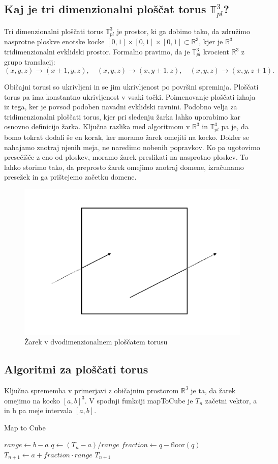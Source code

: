 \documentclass[titlepage]{article}
\begin{document}
\subsection{Kaj je tri dimenzionalni ploščat torus \texorpdfstring{\( \mathbb{T}_{pl}^{3} \)}{T3pl}?}

Tri dimenzionalni ploščati torus \( \mathbb{T}^3_{pl} \) je prostor, ki ga dobimo tako, da združimo nasprotne ploskve enotske kocke \([0,1] \times [0,1] \times [0,1] \subset \mathbb{R}^3 \), kjer je \(\mathbb{R}^3\) tridimenzionalni evklidski prostor. Formalno pravimo, da je \( \mathbb{T}^3_{pl} \) kvocient \(\mathbb{R}^3\) z grupo translacij:
\[
(x, y, z) \to (x \pm 1, y, z), \quad (x, y, z) \to (x, y \pm 1, z), \quad (x, y, z) \to (x, y, z \pm 1).
\]

Običajni torusi so ukrivljeni in se jim ukrivljenost po površini spreminja. Ploščati torus pa ima konstantno ukrivljenost v vsaki točki. Poimenovanje ploščati izhaja iz tega, ker je povsod podoben navadni evklidski ravnini. Podobno velja za tridimenzionalni ploščati torus, kjer pri sledenju žarka lahko uporabimo kar osnovno definicijo žarka. Ključna razlika med algoritmom v \( \mathbb{R}^3 \) in \( \mathbb{T}^3_{pl} \) pa je, da bomo tokrat dodali še en korak, ker moramo žarek omejiti na kocko. Dokler se nahajamo znotraj njenih meja, ne naredimo nobenih popravkov. Ko pa ugotovimo presečišče z eno od ploskev, moramo žarek preslikati na nasprotno ploskev. To lahko storimo tako, da preprosto žarek omejimo znotraj domene, izračunamo presežek in ga prištejemo začetku domene.

\begin{figure}[H]
    \centering
    \includegraphics[width=0.5\linewidth]{Images/flat_torus_zrcaljenje.png}
    \caption{Žarek v dvodimenzionalnem ploščatem torusu}
    \label{Slika:Žarek v dvodimenzionalnem flat torusu}
\end{figure}
\subsection{Algoritmi za ploščati torus}
Ključna sprememba v primerjavi z običajnim prostorom $\mathbb{R}^{3}$ je ta, da žarek omejimo na kocko $[a,b]^{3}$. V spodnji funkciji mapToCube je $T_{n}$ začetni vektor, a in b pa meje intervala $[a,b]$.
\begin{algorithm}[H]
\caption{Map to Cube}\label{alg:mapToCube}
\begin{algorithmic}[1]
    \State $range \gets b - a$
    \State $q \gets (T_{n} - a) / range$
    \State $fraction \gets q - \text{floor}(q)$
    \State $T_{n+1} \gets a + fraction \cdot range$
    \State \Return $T_{n+1}$
\EndFunction
\end{algorithmic}
\end{algorithm}
\end{document}
